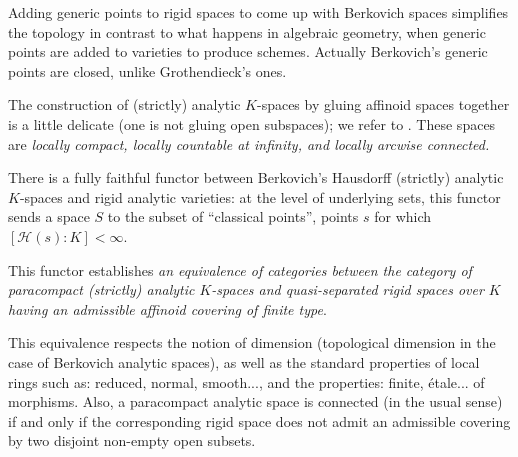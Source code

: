 \begin{rem}
 Adding generic points to rigid spaces 
 to come up with Berkovich spaces simplifies the topology in contrast to 
 what happens in algebraic geometry, when
 generic points are added to varieties to produce schemes.
 Actually Berkovich's generic points are closed, unlike Grothendieck's
 ones.
\end{rem}

\begin{para}\label{para:strict-analytic}
 The construction of (strictly) analytic $K$-spaces by gluing affinoid
 spaces together is a little delicate (one is not gluing open
 subspaces); we refer to \cite{ecfnas}.  These spaces are \emph{locally 
 compact, locally countable at infinity, and locally arcwise connected.} 

 There is a fully faithful functor between Berkovich's Hausdorff 
 (strictly) analytic $K$-spaces and rigid analytic varieties: at the
 level of underlying sets, this functor sends a space $S$ to the subset of
 ``classical points'', \ie points $s$ for which $[\mathscr{H}(s):K]<\infty$.

 This functor establishes \emph{an equivalence of categories 
 between the category of paracompact (strictly)
 analytic $K$-spaces and quasi-separated rigid spaces over $K$ having 
 an admissible affinoid covering of finite type}.

 This equivalence respects the notion of dimension
 (topological dimension in the case of Berkovich analytic spaces), as
 well as the standard properties of local rings such as: reduced,
 normal, smooth..., and the properties: finite, \'etale...  of
 morphisms. Also, a paracompact analytic space is connected (in the
 usual sense) if and only if the corresponding rigid space does not
 admit an admissible covering by two disjoint non-empty open subsets.


\end{para}
